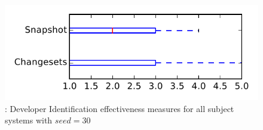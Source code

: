 
\begin{figure}
\centering
\includegraphics[height=0.4\textheight]{figures/dit_seed/rq1_tiny_30}
\caption{\rtwo: Developer Identification effectiveness measures for all subject systems with $seed=30$}
\label{fig:dit_seed:rq1:tiny}
\end{figure}
